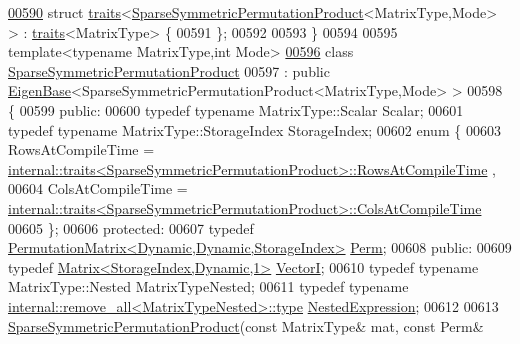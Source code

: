 \begin{DoxyCode}
\hyperlink{struct_eigen_1_1internal_1_1traits_3_01_sparse_symmetric_permutation_product_3_01_matrix_type_00_01_mode_01_4_01_4}{00590} \textcolor{keyword}{struct }\hyperlink{struct_eigen_1_1internal_1_1traits}{traits}<\hyperlink{class_eigen_1_1_sparse_symmetric_permutation_product}{SparseSymmetricPermutationProduct}<MatrixType,Mode> > :
       \hyperlink{struct_eigen_1_1internal_1_1traits}{traits}<MatrixType> \{
00591 \};
00592 
00593 \}
00594 
00595 \textcolor{keyword}{template}<\textcolor{keyword}{typename} MatrixType,\textcolor{keywordtype}{int} Mode>
\hyperlink{class_eigen_1_1_sparse_symmetric_permutation_product}{00596} \textcolor{keyword}{class }\hyperlink{class_eigen_1_1_sparse_symmetric_permutation_product}{SparseSymmetricPermutationProduct}
00597   : \textcolor{keyword}{public} \hyperlink{group___core___module_struct_eigen_1_1_eigen_base}{EigenBase}<SparseSymmetricPermutationProduct<MatrixType,Mode> >
00598 \{
00599   \textcolor{keyword}{public}:
00600     \textcolor{keyword}{typedef} \textcolor{keyword}{typename} MatrixType::Scalar Scalar;
00601     \textcolor{keyword}{typedef} \textcolor{keyword}{typename} MatrixType::StorageIndex StorageIndex;
00602     \textcolor{keyword}{enum} \{
00603       RowsAtCompileTime = 
      \hyperlink{struct_eigen_1_1internal_1_1traits}{internal::traits<SparseSymmetricPermutationProduct>::RowsAtCompileTime}
      ,
00604       ColsAtCompileTime = 
      \hyperlink{struct_eigen_1_1internal_1_1traits}{internal::traits<SparseSymmetricPermutationProduct>::ColsAtCompileTime}
00605     \};
00606   \textcolor{keyword}{protected}:
00607     \textcolor{keyword}{typedef} \hyperlink{group___core___module}{PermutationMatrix<Dynamic,Dynamic,StorageIndex>} 
      \hyperlink{group___core___module}{Perm};
00608   \textcolor{keyword}{public}:
00609     \textcolor{keyword}{typedef} \hyperlink{group___core___module}{Matrix<StorageIndex,Dynamic,1>} \hyperlink{group___core___module}{VectorI};
00610     \textcolor{keyword}{typedef} \textcolor{keyword}{typename} MatrixType::Nested MatrixTypeNested;
00611     \textcolor{keyword}{typedef} \textcolor{keyword}{typename} \hyperlink{group___sparse_core___module}{internal::remove\_all<MatrixTypeNested>::type}
       \hyperlink{group___sparse_core___module}{NestedExpression};
00612     
00613     \hyperlink{class_eigen_1_1_sparse_symmetric_permutation_product}{SparseSymmetricPermutationProduct}(\textcolor{keyword}{const} MatrixType& mat, \textcolor{keyword}{const} Perm& 

\end{DoxyCode}

